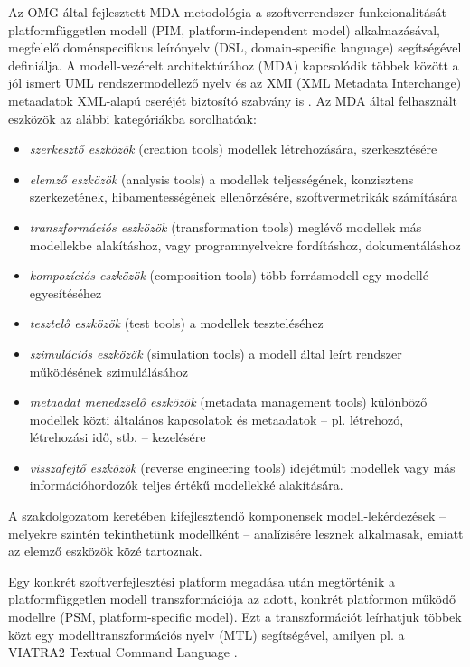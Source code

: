 Az \gls{OMG} által fejlesztett \gls{MDA} metodológia a szoftverrendszer funkcionalitását platformfüggetlen modell (\gls{PIM}, platform-independent model) alkalmazásával, megfelelő doménspecifikus leírónyelv (\gls{DSL}, domain-specific language) segítségével definiálja.
A modell-vezérelt architektúrához (\gls{MDA}) kapcsolódik többek között a jól ismert \gls{UML} rendszermodellező nyelv és az \gls{XMI} (XML Metadata Interchange) metaadatok XML-alapú cseréjét biztosító szabvány is \cite{OMG:MDA:Spec}. 
Az \gls{MDA} által felhasznált eszközök az alábbi kategóriákba sorolhatóak:
\begin{itemize}
	\item \emph{szerkesztő eszközök} (creation tools) modellek létrehozására, szerkesztésére
	\item \emph{elemző eszközök} (analysis tools) a modellek teljességének, konzisztens szerkezetének, hibamentességének ellenőrzésére, szoftvermetrikák számítására
	\item \emph{transzformációs eszközök} (transformation tools) meglévő modellek más modellekbe alakításhoz, vagy programnyelvekre fordításhoz, dokumentáláshoz
	\item \emph{kompozíciós eszközök} (composition tools) több forrásmodell egy modellé egyesítéséhez
	\item \emph{tesztelő eszközök} (test tools) a modellek teszteléséhez
	\item \emph{szimulációs eszközök} (simulation tools) a modell által leírt rendszer működésének szimulálásához
	\item \emph{metaadat menedzselő eszközök} (metadata management tools) különböző modellek közti általános kapcsolatok és metaadatok -- pl. létrehozó, létrehozási idő, stb. -- kezelésére
	\item \emph{visszafejtő eszközök} (reverse engineering tools) idejétmúlt modellek vagy más információhordozók teljes értékű modellekké alakítására.
\end{itemize}

A szakdolgozatom keretében kifejlesztendő komponensek modell-lekérdezések -- melyekre szintén tekinthetünk modellként -- analízisére lesznek alkalmasak, emiatt az elemző eszközök közé tartoznak.

Egy konkrét szoftverfejlesztési platform megadása után megtörténik a platformfüggetlen modell transzformációja az adott, konkrét platformon működő modellre (\gls{PSM}, platform-specific model).
Ezt a transzformációt leírhatjuk többek közt egy modelltranszformációs nyelv (\gls{MTL}) segítségével, amilyen pl. a VIATRA2 Textual Command Language \cite{Balogh:2006:AMT:1141277.1141575}.

